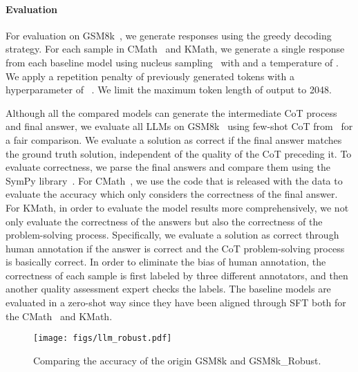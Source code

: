 \documentclass{article}
\begin{document}
\paragraph{Evaluation}
For evaluation on GSM8k~\cite{cobbe2021training}, we generate responses using the greedy decoding strategy.
For each sample in CMath~\cite{wei2023cmath} and KMath, we generate a single response from each baseline model using nucleus sampling~\cite{holtzman2019curious} with  and a temperature of . 
We apply a repetition penalty of previously generated tokens with a hyperparameter of ~\cite{keskar2019ctrl}. 
We limit the maximum token length of output to 2048.

Although all the compared models can generate the intermediate CoT process and final answer, we evaluate all LLMs on GSM8k~\cite{cobbe2021training} using few-shot CoT from~\cite {wei2022chain} for a fair comparison.
We evaluate a solution as correct if the final answer matches the ground truth solution, independent of the quality of the CoT preceding it. 
To evaluate correctness, we parse the final answers and compare them using the SymPy library~\cite{meurer2017sympy}.
For CMath~\cite{wei2023cmath}, we use the code that is released with the data to evaluate the accuracy which only considers the correctness of the final answer.
For KMath, in order to evaluate the model results more comprehensively, we not only evaluate the correctness of the answers but also the correctness of the problem-solving process.
Specifically, we evaluate a solution as correct through human annotation if the answer is correct and the CoT problem-solving process is basically correct.
In order to eliminate the bias of human annotation, the correctness of each sample is first labeled by three different annotators, and then another quality assessment expert checks the labels.
The baseline models are evaluated in a zero-shot way since they have been aligned through SFT both for the CMath~\cite{wei2023cmath} and KMath.

\begin{wrapfigure}{R}{0.5\linewidth}
\begin{center}
    \texttt{[image: figs/llm\_robust.pdf]}
    \end{center}
    \caption{Comparing the accuracy of the origin GSM8k and GSM8k\_Robust.}
    \label{fig:gsm8krobust}
\end{wrapfigure}
\end{document}
